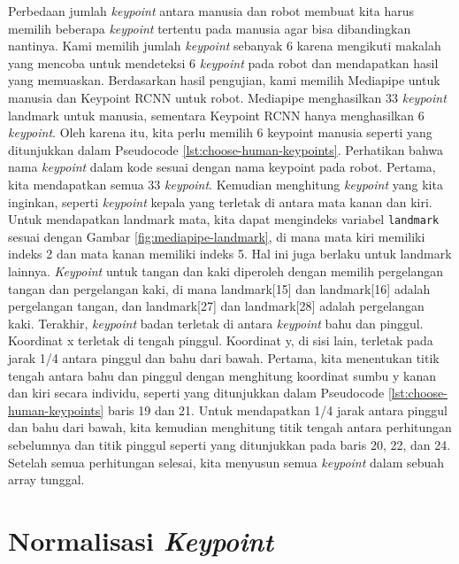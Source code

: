 Perbedaan jumlah \textit{keypoint} antara manusia dan robot membuat kita harus memilih beberapa \textit{keypoint} tertentu pada manusia agar bisa dibandingkan nantinya.
Kami memilih jumlah \textit{keypoint} sebanyak 6 karena mengikuti makalah \parencite{amini2021} yang mencoba untuk mendeteksi 6 \textit{keypoint} pada robot dan mendapatkan hasil yang memuaskan.
Berdasarkan hasil pengujian, kami memilih Mediapipe untuk manusia dan Keypoint RCNN untuk robot. Mediapipe menghasilkan 33 \textit{keypoint} landmark untuk manusia, sementara Keypoint RCNN hanya menghasilkan 6 \textit{keypoint}.
Oleh karena itu, kita perlu memilih 6 keypoint manusia seperti yang ditunjukkan dalam Pseudocode \ref{lst:choose-human-keypoints}.
Perhatikan bahwa nama \textit{keypoint} dalam kode sesuai dengan nama keypoint pada robot. Pertama, kita mendapatkan semua 33 \textit{keypoint}. Kemudian menghitung \textit{keypoint} yang kita inginkan, seperti \textit{keypoint} kepala yang terletak di antara mata kanan dan kiri.
Untuk mendapatkan landmark mata, kita dapat mengindeks variabel \verb|landmark| sesuai dengan Gambar \ref{fig:mediapipe-landmark}, di mana mata kiri memiliki indeks 2 dan mata kanan memiliki indeks 5. Hal ini juga berlaku untuk landmark lainnya.
\textit{Keypoint} untuk tangan dan kaki diperoleh dengan memilih pergelangan tangan dan pergelangan kaki, di mana landmark[15] dan landmark[16] adalah pergelangan tangan, dan landmark[27] dan landmark[28] adalah pergelangan kaki.
Terakhir, \textit{keypoint} badan terletak di antara \textit{keypoint} bahu dan pinggul. Koordinat x terletak di tengah pinggul. Koordinat y, di sisi lain, terletak pada jarak 1/4 antara pinggul dan bahu dari bawah.
Pertama, kita menentukan titik tengah antara bahu dan pinggul dengan menghitung koordinat sumbu y kanan dan kiri secara individu, seperti yang ditunjukkan dalam Pseudocode \ref{lst:choose-human-keypoints} baris 19 dan 21. Untuk mendapatkan 1/4 jarak antara pinggul dan bahu dari bawah, kita kemudian menghitung titik tengah antara perhitungan sebelumnya dan titik pinggul seperti yang ditunjukkan pada baris 20, 22, dan 24.
Setelah semua perhitungan selesai, kita menyusun semua \textit{keypoint} dalam sebuah array tunggal.



\newpage
\section{Normalisasi \textit{Keypoint}}
\label{sec:keypoint-normalization}

